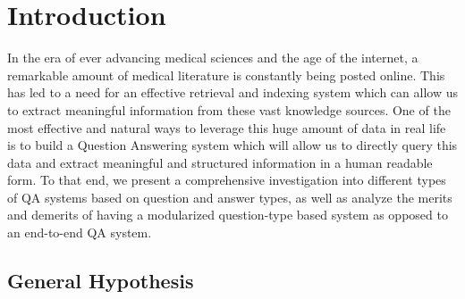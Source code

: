 


\section{Introduction}

In the era of ever advancing medical sciences and the age of the internet, a remarkable amount of medical literature is constantly being posted online. This has led to a need for an effective retrieval and indexing system which can allow us to extract meaningful information from these vast knowledge sources. One of the most effective and natural ways to leverage this huge amount of data in real life is to build a Question Answering system which will allow us to directly query this data and extract meaningful and structured information in a human readable form. To that end, we present a comprehensive investigation into different types of QA systems based on question and answer types, as well as analyze the merits and demerits of having a modularized question-type based system as opposed to an end-to-end QA system.

\subsection{General Hypothesis}


